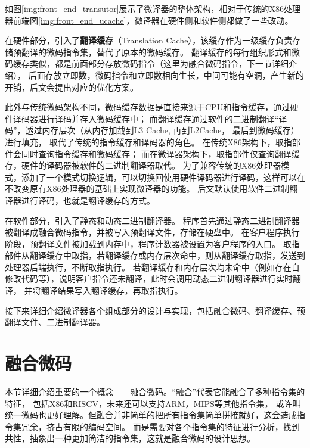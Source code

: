 如图\ref{img:front_end_transutor}展示了微译器的整体架构，相对于传统的X86处理器前端图\ref{img:front_end_ucache}，微译器在硬件侧和软件侧都做了一些改动。


在硬件部分，引入了\textbf{翻译缓存}（Translation Cache），该缓存作为一级缓存负责存储预翻译的微码指令集，替代了原本的微码缓存。
翻译缓存的每行组织形式和微码缓存类似，都是前面部分存放微码指令（这里为融合微码指令，下一节详细介绍），
后面存放立即数，微码指令和立即数相向生长，中间可能有空洞，产生新的开销，后文会提出对应的优化方案。

此外与传统微码架构不同，微码缓存数据是直接来源于CPU和指令缓存，通过硬件译码器进行译码并存入微码缓存中；
而翻译缓存通过软件的二进制翻译“译码”，透过内存层次（从内存加载到L3 Cache, 再到L2Cache， 最后到微码缓存）进行填充，
取代了传统的指令缓存和译码器的角色。
在传统X86架构下，取指部件会同时查询指令缓存和微码缓存；
而在微译器架构下，取指部件仅查询翻译缓存，硬件的译码器被软件的二进制翻译器取代。
为了兼容传统的X86处理器模式，添加了一个模式切换逻辑，可以切换回使用硬件译码器进行译码，这样可以在不改变原有X86处理器的基础上实现微译器的功能。
后文默认使用软件二进制翻译器进行译码，也就是翻译缓存的方式。


在软件部分，引入了静态和动态二进制翻译器。
程序首先通过静态二进制翻译器被翻译成融合微码指令，并被写入预翻译文件，存储在硬盘中。
在客户程序执行阶段，预翻译文件被加载到内存中，程序计数器被设置为客户程序的入口。
取指部件从翻译缓存中取指，若翻译缓存或内存层次命中，则从翻译缓存取指，发送到处理器后端执行，不断取指执行。
若翻译缓存和内存层次均未命中（例如存在自修改代码等），说明客户指令还未翻译，此时会调用动态二进制翻译器进行实时翻译，
并将翻译结果写入翻译缓存，再取指执行。

接下来详细介绍微译器各个组成部分的设计与实现，包括融合微码、翻译缓存、预翻译文件、二进制翻译器。

\section{融合微码}\label{sec:tisa}
本节详细介绍重要的一个概念——融合微码。“融合”代表它能融合了多种指令集的特征，
包括X86和RISCV，未来还可以支持ARM，MIPS等其他指令集，
或许叫统一微码也更好理解。但融合并非简单的把所有指令集简单拼接就好，这会造成指令集冗余，挤占有限的编码空间。
而是需要对各个指令集的特征进行分析，找到共性，抽象出一种更加简洁的指令集，这就是融合微码的设计思想。

